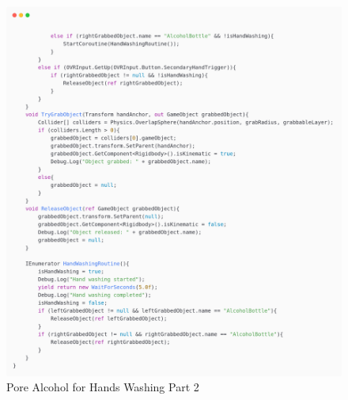 \newpage
\begin{figure}[h] 
	\centering
	\includegraphics[width=1\textwidth, height=0.7\textheight]{Images/pore alcohol2.png}
	\caption{Pore Alcohol for Hands Washing Part 2}
	\label{fig:Hands Washing}
\end{figure}

